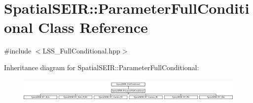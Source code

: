 \hypertarget{classSpatialSEIR_1_1ParameterFullConditional}{\section{Spatial\-S\-E\-I\-R\-:\-:Parameter\-Full\-Conditional Class Reference}
\label{classSpatialSEIR_1_1ParameterFullConditional}
}


{\ttfamily \#include $<$L\-S\-S\-\_\-\-Full\-Conditional.\-hpp$>$}

Inheritance diagram for Spatial\-S\-E\-I\-R\-:\-:Parameter\-Full\-Conditional\-:\begin{figure}[H]
\begin{center}
\leavevmode
\includegraphics[height=1.201717cm]{classSpatialSEIR_1_1ParameterFullConditional}
\end{center}
\end{figure}
